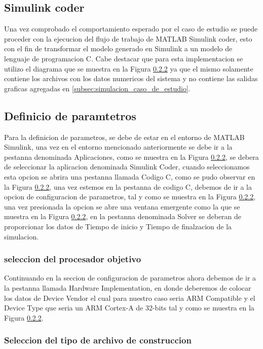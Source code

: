 \subsection{Simulink coder}

Una vez comprobado el comportamiento esperado por el caso de estudio se puede proceder con la ejecucion del flujo de trabajo de MATLAB Simulink coder, esto con el fin de transformar el modelo generado en Simulink a un modelo de lenguaje de programacion C. Cabe destacar que para esta implementacion se utilizo el diagrama que se muestra en la Figura \ref{} ya que el mismo solamente contiene los archivos con los datos numericos del sistema y no contiene las salidas graficas agregadas en \ref{subsec:simulacion_caso_de_estudio}.


\subsection{Definicio de paramtetros}

Para la definicion de parametros, se debe de estar en el entorno de MATLAB Simulink, una vez en el entorno mencionado anteriormente se debe ir a la pestanna denominada Aplicaciones, como se muestra en la Figura \ref{}, se debera de seleccionar la aplicacion denominada Simulink Coder, cuando seleccionamos esta opcion se abrira una pestanna llamada Codigo C, como se pudo observar en la Figura \ref{}, una vez estemos en la pestanna de codigo C, debemos de ir a la opcion de configuracion de parametros, tal y como se muestra en la Figura \ref{}, una vez presionada la opcion se abre una ventana emergente como la que se muestra en la Figura \ref{}, en la pestanna denominada Solver se deberan de proporcionar los datos de Tiempo de inicio y Tiempo de finalzacion de la simulacion.

\subsubsection{seleccion del procesador objetivo}

Continuando en la seccion de configuracion de parametros ahora debemos de ir a la pestanna llamada Hardware Implementation, en donde deberemos de colocar los datos de Device Vendor el cual para nuestro caso seria ARM Compatible y el Device Type que seria un ARM Cortex-A de 32-bits tal y como se muestra en la Figura \ref{}.


\subsubsection{Seleccion del tipo de archivo de construccion}

